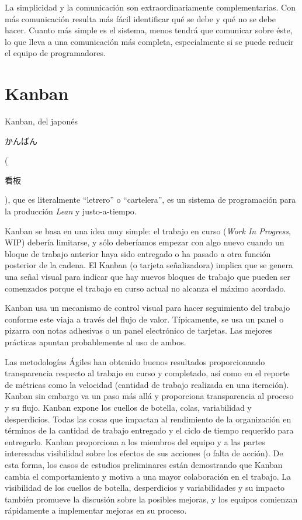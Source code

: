 La simplicidad y la comunicación son extraordinariamente complementarias. Con más comunicación resulta más fácil identificar qué se debe y qué no se debe hacer. Cuanto más simple es el sistema, menos tendrá que comunicar sobre éste, lo que lleva a una comunicación más completa, especialmente si se puede reducir el equipo de programadores.

\section{Kanban}

Kanban, del japonés \begin{CJK*}{UTF8}{gbsn}かんばん\end{CJK*}(\begin{CJK*}{UTF8}{gbsn}看板\end{CJK*}), que es literalmente ``letrero'' o ``cartelera'', es un sistema de programación para la producción \textit{Lean} y justo-a-tiempo.

Kanban se basa en una idea muy simple: el trabajo en curso (\textit{Work In Progress}, WIP) debería limitarse, y sólo deberíamos empezar con algo nuevo cuando un bloque de trabajo anterior haya sido entregado o ha pasado a otra función posterior de la cadena. El Kanban (o tarjeta señalizadora) implica que se genera una señal visual para indicar que hay nuevos bloques de trabajo que pueden ser comenzados porque el trabajo en curso actual no alcanza el máximo acordado.

Kanban usa un mecanismo de control visual para hacer seguimiento del trabajo conforme este viaja a través del flujo de valor. Típicamente, se usa un panel o pizarra con notas adhesivas o un panel electrónico de tarjetas. Las mejores prácticas apuntan probablemente al uso de ambos.

Las metodologías Ágiles han obtenido buenos resultados proporcionando transparencia respecto al trabajo en curso y completado, así como en el reporte de métricas como la velocidad (cantidad de trabajo realizada en una iteración). Kanban sin embargo va un paso más allá y proporciona transparencia al proceso y su flujo. Kanban expone los cuellos de botella, colas, variabilidad y desperdicios. Todas las cosas que impactan al rendimiento de la organización en términos de la cantidad de trabajo entregado y el ciclo de tiempo requerido para entregarlo. Kanban proporciona a los miembros del equipo y a las partes interesadas visibilidad sobre los efectos de sus acciones (o falta de acción). De esta forma, los casos de estudios preliminares están demostrando que Kanban cambia el comportamiento y motiva a una mayor colaboración en el trabajo. La visibilidad de los cuellos de botella, desperdicios y variabilidades y su impacto también promueve la discusión sobre la posibles mejoras, y los equipos comienzan rápidamente a implementar mejoras en su proceso.\cite{Skarin201003}

